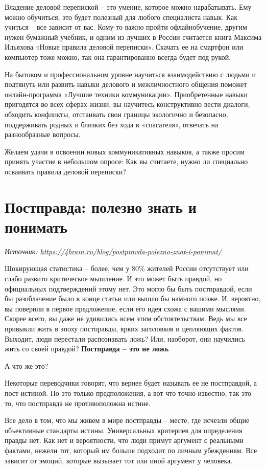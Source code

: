 Владение деловой перепиской – это умение, которое можно нарабатывать. Ему можно обучиться, это будет полезный для любого специалиста навык. Как учиться – все зависит от вас. Кому-то важно пройти офлайнобучение, другим нужен бумажный учебник, и одним из лучших в России считается книга Максима Ильяхова «Новые правила деловой переписки».  Скачать ее на смартфон или компьютер тоже можно, так она гарантированно всегда будет под рукой.

На бытовом и профессиональном уровне научиться взаимодействию с людьми и подтянуть или развить навыки делового и межличностного общения поможет онлайн-программа «Лучшие техники коммуникации». Приобретенные навыки пригодятся во всех сферах жизни, вы научитесь конструктивно вести диалоги, обходить конфликты, отстаивать свои границы экологично и безопасно, поддерживать родных и близких без хода в «спасателя», отвечать на разнообразные вопросы.

Желаем удачи в освоении новых коммуникативных навыков, а также просим принять участие в небольшом опросе: Как вы считаете, нужно ли специально осваивать правила деловой переписки?

\clearpage

\section{Постправда: полезно знать и понимать}

\textit{Источник: \url{https://4brain.ru/blog/postpravda-polezno-znat-i-ponimat/}}

Шокирующая статистика – более, чем у 80\% жителей России отсутствует или слабо развито критическое мышление. И это может быть правдой, но официальных подтверждений этому нет. Это могло бы быть постправдой, если бы разоблачение было в конце статьи или вышло бы намного позже. И, вероятно, вы поверили в первое предложение, если его идея схожа с вашими мыслями. Скорее всего, вы даже не удивились всем этим обстоятельствам. Ведь мы все привыкли жить в эпоху постправды, ярких заголовков и цепляющих фактов. Выходит, люди перестали распознавать ложь? Или, наоборот, они научились жить со своей правдой?
\textbf{Постправда – это не ложь}

А что же это?

Некоторые переводчики говорят, что вернее будет называть ее не постправдой, а пост-истиной. Но это только предположения, а вот что точно известно, так это то, что постправда не противоположна истине.

Все дело в том, что мы живем в мире постправды – месте, где исчезли общие объективные стандарты истины. Универсальных критериев для определения правды нет. Как нет и вероятности, что люди примут аргумент с реальными фактами, нежели тот, который им больше подходит по личным убеждениям. Все зависит от эмоций, которые вызывает тот или иной аргумент у человека.


